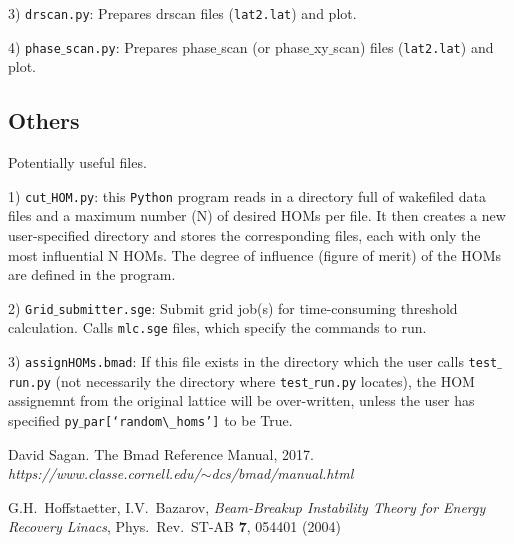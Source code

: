 \documentclass{article}
\begin{document}
3) \texttt{drscan.py}: Prepares drscan files (\texttt{lat2.lat}) and plot.

4) \texttt{phase$\_$scan.py}: Prepares phase$\_$scan (or phase$\_$xy$\_$scan) files (\texttt{lat2.lat}) and plot.

\subsection{Others}
Potentially useful files.

1) \texttt{cut$\_$HOM.py}: this \texttt{Python} program reads in a directory full of wakefiled data files and a maximum number (N) of desired HOMs per file. It then creates a new user-specified directory and stores the corresponding files, each with only the most influential N HOMs. The degree of influence (figure of merit) of the HOMs are defined in the program.

2) \texttt{Grid$\_$submitter.sge}: Submit grid job(s) for time-consuming threshold calculation. Calls \texttt{mlc.sge} files, which specify the commands to run.

3) \texttt{assignHOMs.bmad}: If this file exists in the directory which the user calls \texttt{test$\_$run.py}  (not necessarily the directory where \texttt{test$\_$run.py} locates), the HOM assignemnt from the original lattice will be over-written, unless the user has specified \texttt{py$\_$par[`random$\_$homs']} to be True.



\begin{thebibliography}{99}

David Sagan. The Bmad Reference Manual, 2017.\\
{\em https://www.classe.cornell.edu/$\sim$dcs/bmad/manual.html}


 G.H.~Hoffstaetter, I.V.~Bazarov, \emph{
Beam-Breakup Instability Theory for Energy Recovery Linacs},
Phys.~Rev.~ST-AB {\bf 7}, 054401 (2004)


\end{thebibliography}
\end{document}
